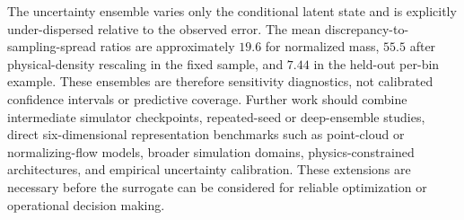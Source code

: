 The uncertainty ensemble varies only the conditional latent state and is explicitly under-dispersed relative to the observed error. The mean discrepancy-to-sampling-spread ratios are approximately \(19.6\) for normalized mass, \(55.5\) after physical-density rescaling in the fixed sample, and \(7.44\) in the held-out per-bin example. These ensembles are therefore sensitivity diagnostics, not calibrated confidence intervals or predictive coverage. Further work should combine intermediate simulator checkpoints, repeated-seed or deep-ensemble studies, direct six-dimensional representation benchmarks such as point-cloud or normalizing-flow models, broader simulation domains, physics-constrained architectures, and empirical uncertainty calibration. These extensions are necessary before the surrogate can be considered for reliable optimization or operational decision making.

